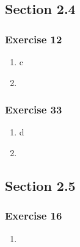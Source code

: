 \documentclass[a4paper]{article}
\newcommand{\ex}[1]{\subsubsection*{#1}}
\begin{document}
\vspace{2em}
\subsection*{Section 2.4}
\vspace{1em}

\ex{Exercise 12}
\begin{enumerate}[label=\alph*)]
    \item{ c
    }

    \item{
    }
\end{enumerate}


\ex{Exercise 33}
\begin{enumerate}[label=\alph*)]
    \item{ d
    }

    \item{
    }
\end{enumerate}


\vspace{2em}
\subsection*{Section 2.5}
\vspace{1em}

\ex{Exercise 16}
\begin{enumerate}[label=\alph*)]
    \item{
    }
\end{enumerate}


%
\end{document}
